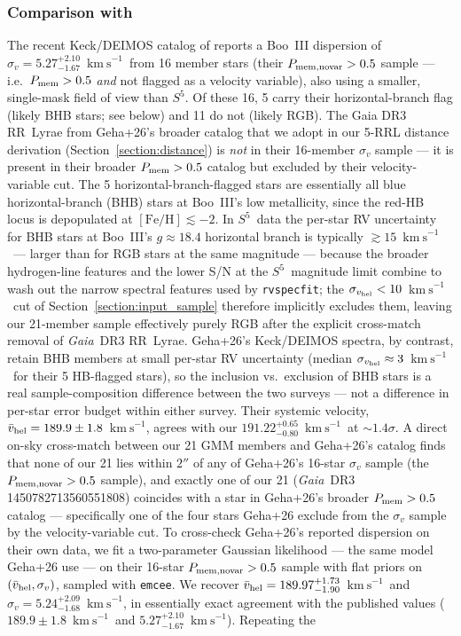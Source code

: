 \documentclass[twocolumn]{aastex631}
\newcommand{\SSSSS}{${S}^5$\xspace}
\newcommand{\gaia}{\textit{Gaia}\xspace}
\newcommand{\vlosUnits}{$\mathrm{km~s}^{-1}$\xspace}
\begin{document}
\subsubsection{Comparison with \citet{Geha2026}}
The recent Keck/DEIMOS catalog of \citet{Geha2026} reports a Boo~III dispersion of $\sigma_v = 5.27^{+2.10}_{-1.67}$~\vlosUnits\ from 16 member stars (their $P_{\rm mem,novar} > 0.5$ sample --- i.e.\ $P_{\rm mem} > 0.5$ \emph{and} not flagged as a velocity variable), also using a smaller, single-mask field of view than \SSSSS.  Of these 16, 5 carry their horizontal-branch flag (likely BHB stars; see below) and 11 do not (likely RGB).  The Gaia DR3 RR~Lyrae from Geha+26's broader catalog that we adopt in our 5-RRL distance derivation (Section~\ref{section:distance}) is \emph{not} in their 16-member $\sigma_v$ sample --- it is present in their broader $P_{\rm mem} > 0.5$ catalog but excluded by their velocity-variable cut.  The 5 horizontal-branch-flagged stars are essentially all blue horizontal-branch (BHB) stars at Boo~III's low metallicity, since the red-HB locus is depopulated at $[\mathrm{Fe/H}] \lesssim -2$.  In \SSSSS\ data the per-star RV uncertainty for BHB stars at Boo~III's $g \approx 18.4$ horizontal branch is typically $\gtrsim 15$~\vlosUnits\ --- larger than for RGB stars at the same magnitude --- because the broader hydrogen-line features and the lower S/N at the \SSSSS\ magnitude limit combine to wash out the narrow spectral features used by \texttt{rvspecfit}; the $\sigma_{v_{\rm hel}} < 10$~\vlosUnits\ cut of Section~\ref{section:input_sample} therefore implicitly excludes them, leaving our 21-member sample effectively purely RGB after the explicit cross-match removal of \gaia\ DR3 RR~Lyrae.  Geha+26's Keck/DEIMOS spectra, by contrast, retain BHB members at small per-star RV uncertainty (median $\sigma_{v_{\rm hel}} \approx 3$~\vlosUnits\ for their 5 HB-flagged stars), so the inclusion vs.\ exclusion of BHB stars is a real sample-composition difference between the two surveys --- not a difference in per-star error budget within either survey.  Their systemic velocity, $\bar v_{\rm hel} = 189.9 \pm 1.8$~\vlosUnits, agrees with our $191.22^{+0.65}_{-0.80}$~\vlosUnits\ at $\sim 1.4\sigma$.  A direct on-sky cross-match between our 21 GMM members and Geha+26's catalog finds that none of our 21 lies within $2''$ of any of Geha+26's 16-star $\sigma_v$ sample (the $P_{\rm mem,novar} > 0.5$ sample), and exactly one of our 21 (\gaia\ DR3 1450782713560551808) coincides with a star in Geha+26's broader $P_{\rm mem} > 0.5$ catalog --- specifically one of the four stars Geha+26 exclude from the $\sigma_v$ sample by the velocity-variable cut.  To cross-check Geha+26's reported dispersion on their own data, we fit a two-parameter Gaussian likelihood --- the same model Geha+26 use \citep[Walker2006 form;][]{Walker2006} --- on their 16-star $P_{\rm mem,novar} > 0.5$ sample with flat priors on $(\bar v_{\rm hel}, \sigma_v)$, sampled with \texttt{emcee}.  We recover $\bar v_{\rm hel} = 189.97^{+1.73}_{-1.90}$~\vlosUnits\ and $\sigma_v = 5.24^{+2.09}_{-1.68}$~\vlosUnits, in essentially exact agreement with the \citet{Geha2026} published values ($189.9 \pm 1.8$~\vlosUnits\ and $5.27^{+2.10}_{-1.67}$~\vlosUnits).  Repeating the 
\end{document}
